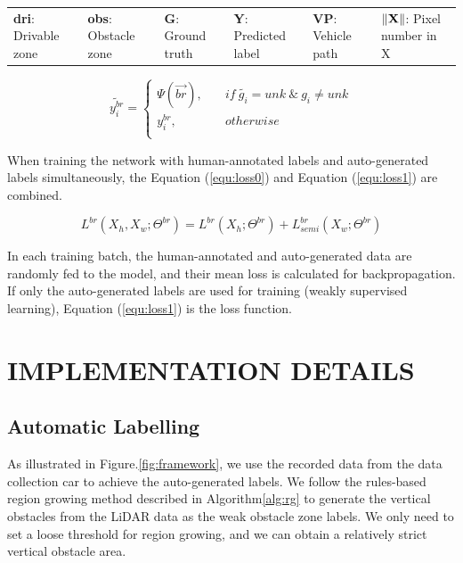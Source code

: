 \documentclass[letterpaper, 10 pt, conference]{ieeeconf}  %
\begin{document}
\begin{table}
\begin{tabular}{cclccl}
		\hline
	\end{tabular}
	\renewcommand{\arraystretch}{2.3}
	\begin{tabular}{llllll}
		\textbf{dri}: Drivable zone                 & \textbf{obs}: Obstacle zone              & \textbf{G}: Ground truth                            & \textbf{Y}: Predicted label & \textbf{VP}: Vehicle path & $\Arrowvert \textbf{X}\Arrowvert$: Pixel number in X \\
	\end{tabular}
	\vspace{-2mm}
\end{table}

\vspace{-4mm}
\begin{equation}
\widetilde{y_i^{br}}= 
\left\{
\begin{array}{ll}
\Psi(\vec{br}), &\quad if \ \widetilde{g_i} = unk\ \&\ g_i \neq unk \\ 
y_i^{br}, &\quad otherwise \\
\end{array}
\right.
\end{equation}

When training the network with human-annotated labels and auto-generated labels simultaneously, the Equation (\ref{equ:loss0}) and Equation (\ref{equ:loss1}) are combined.

\vspace{-2mm}
\begin{equation}
\label{equ:loss2}
L^{br}(X_h,X_w;\Theta^{br})=L^{br}(X_h;\Theta^{br})+L^{br}_{semi}(X_w;\Theta^{br})
\end{equation}

In each training batch, the human-annotated and auto-generated data are randomly fed to the model, and their mean loss is calculated for backpropagation. If only the auto-generated labels are used for training (weakly supervised learning), Equation (\ref{equ:loss1}) is the loss function.

\section{IMPLEMENTATION DETAILS} \label{sec:implementationdetails}

\subsection{Automatic Labelling}	\label{sec:autolabel}

As illustrated in Figure.\ref{fig:framework}, we use the recorded data from the data collection car to achieve the auto-generated labels.
We follow the rules-based region growing method described in Algorithm\ref{alg:rg} to generate the vertical obstacles from the LiDAR data as the weak obstacle zone labels. We only need to set a loose threshold for region growing, and we can obtain a relatively strict vertical obstacle area.
\end{document}
